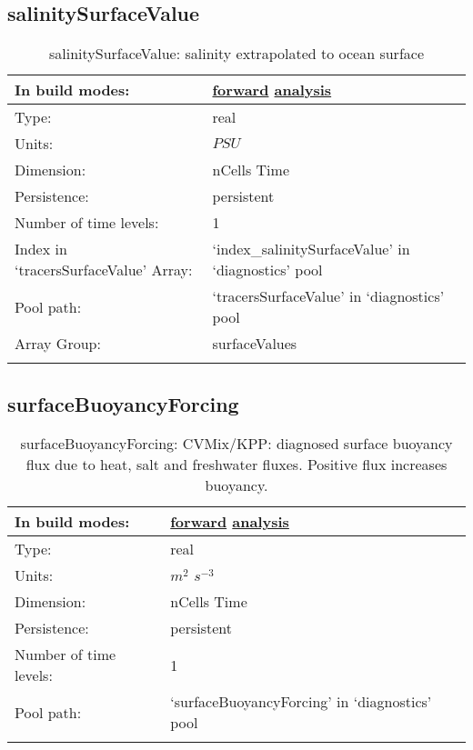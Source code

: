 \subsection[salinitySurfaceValue]{salinitySurfaceValue}
\label{subsec:var_sec_diagnostics_salinitySurfaceValue}
\begin{center}
\begin{longtable}{| p{2.0in} | p{4.0in} |}
        \hline 
        In build modes: & \hyperref[subsec:forward_var_tab_diagnostics]{forward} \hyperref[subsec:analysis_var_tab_diagnostics]{analysis} \\
        \hline 
        Type: & real \\
        \hline 
        Units: & $PSU$ \\
        \hline 
        Dimension: & nCells Time \\
        \hline 
        Persistence: & persistent \\
        \hline 
        Number of time levels: & 1 \\
        \hline 
		 Index in `tracersSurfaceValue' Array: & `index\_salinitySurfaceValue' in `diagnostics' pool \\
		 \hline 
            Pool path: & `tracersSurfaceValue' in `diagnostics' pool \\
		 \hline 
		 Array Group: & surfaceValues \\
		 \hline 
    \caption{salinitySurfaceValue: salinity extrapolated to ocean surface}
\end{longtable}
\end{center}
\subsection[surfaceBuoyancyForcing]{surfaceBuoyancyForcing}
\label{subsec:var_sec_diagnostics_surfaceBuoyancyForcing}
\begin{center}
\begin{longtable}{| p{2.0in} | p{4.0in} |}
        \hline 
        In build modes: & \hyperref[subsec:forward_var_tab_diagnostics]{forward} \hyperref[subsec:analysis_var_tab_diagnostics]{analysis} \\
        \hline 
        Type: & real \\
        \hline 
        Units: & $m^2$ $s^{-3}$ \\
        \hline 
        Dimension: & nCells Time \\
        \hline 
        Persistence: & persistent \\
        \hline 
        Number of time levels: & 1 \\
        \hline 
            Pool path: & `surfaceBuoyancyForcing' in `diagnostics' pool \\
		 \hline 
    \caption{surfaceBuoyancyForcing: CVMix/KPP: diagnosed surface buoyancy flux due to heat, salt and freshwater fluxes. Positive flux increases buoyancy.}
\end{longtable}
\end{center}
